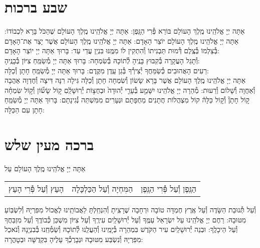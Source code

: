 \documentclass[twoside, openany, parskip=half, 11pt]{book}
\begin{document}
\section[שבע ברכות]{ שבע ברכות }

אַתָּה יְיָ אֱלֹהֵֽינוּ מֶֽלֶךְ הָעוֹלָם בּוֹרֵא פְּ֯רִי הַגָּֽפֶן:\hfill \break
{}
אַתָּה יְיָ אֱלֹהֵֽינוּ מֶֽלֶךְ הָעוֹלָם שֶׁהַכֹּל בָּרָא לִכְבוֹדוֹ:\hfill \break
{}
אַתָּה יְיָ אֱלֹהֵֽינוּ מֶֽלֶךְ הָעוֹלָם יוֹצֵר הָאָדָם:\hfill \break
{}
אַתָּה יְיָ אֱלֹהֵֽינוּ מֶֽלֶךְ הָעוֹלָם אֲשֶׁר יָצַר אֶת־הָאָדָם בְּ֯צַלְמוֹ
בְּ֯צֶֽלֶם דְּ֯מוּת תַּבְנִיתוֹ וְ֯הִתְקִין לוֹ מִמֶּֽנּוּ בִּנְיַן עֲדֵי עַד: בָּרוּךְ אַתָּה יְיָ יוֹצֵר הָאָדָם:\\
וְ֯תָגֵל הָעֲקָרָה בְּ֯קִבּוּץ בָּנֶֽיהָ לְ֯תוֹכָהּ בְּ֯שִׂמְחָה:
בָּרוּךְ אַתָּה יְיָ מְ֯שַׂמֵּֽחַ צִיּוֹן בְּ֯בָנֶֽיהָ:\\
רֵעִים הָאֲהוּבִים כְּ֯שַׂמֵּחֲךָ יְ֯צִירְ֯ךָ בְּ֯גַן עֵֽדֶן מִקֶּֽדֶם:
בָּרוּךְ אַתָּה יְיָ מְ֯שַׂמֵּֽחַ חָתָן וְ֯כַלָּה:\\
אַתָּה יְיָ אֱלֹהֵֽינוּ מֶֽלֶךְ הָעוֹלָם
אֲשֶׁר בָּרָא שָׂשׂוֹן וְ֯שִׂמְחָה חָתָן וְ֯כַלָּה גִּילָה רִנָּה דִּיצָה וְ֯חֶדְוָה
אַהֲבָה וְ֯אַחֲוָה וְ֯שָׁלוֹם וְ֯רֵעוּת:
מְ֯הֵרָה יְיָ אֱלֹהֵֽינוּ יִשָּׁמַ֣ע
בְּ֯עָרֵ֤י יְ֯הוּדָה֙ וּבְחֻצ֣וֹת יְ֯רֽוּשָׁלַֽ֔םִ
ק֣וֹל שָׂשׂ֞וֹן וְ֯ק֣וֹל שִׂמְחָ֗ה ק֣וֹל חָתָן֘ וְ֯ק֣וֹל כַּלָּה֒
קוֹל מִצְהֲלוֹת חֲתָנִים מֵחֻפָּתָם וּנְעָרִים מִמִּשְׁתֵּה נְ֯גִינָתָם:
בָּרוּךְ אַתָּה יְיָ מְ֯שַׂמֵּֽחַ חָתָן עִם הַכַּלָּה:


\nextpage

\section[ברכה מעין שלש]{ ברכה מעין שלש }


אַתָּה יְיָ אֱלֹהֵֽינוּ מֶֽלֶךְ הָעוֹלָם עַל

\begin{tabular}{>{\centering\arraybackslash}m{} | >{\centering\arraybackslash}m{} | >{\centering\arraybackslash}m{}}

הָעֵץ וְ֯עַל פְּ֯רִי הָעֵץ
&
הַמִּחְיָה וְ֯עַל הַכַּלְכָּלָה
&
הַגֶּֽפֶן וְ֯עַל פְּ֯רִי הַגֶּֽפֶן \\

\end{tabular}

וְ֯עַל תְּ֯נוּבַת הַשָּׂדֶה וְ֯עַל אֶֽרֶץ חֶמְדָּה טוֹבָה וּרְחָבָה
שֶׁרָצִֽיתָ וְ֯הִנְחַֽלְתָּ לַאֲבוֹתֵֽינוּ לֶאֱכוֹל מִפִּרְיָהּ וְ֯לִשְׂבּֽוֹעַ מִטּוּבָהּ:
רַחֶם יְיָ אֱלֹהֵֽינוּ עַל יִשְׂרָאֵל עַמֶּֽךָ וְ֯עַל יְ֯רוּשָׁלַֽיִם עִירֶֽךָ וְ֯עַל צִיּוֹן מִשְׁכַּן כְּ֯בוֹדֶֽךָ וְ֯עַל מִזְבַּחֲךָ וְ֯עַל הֵיכָלֶֽךָ: וּבְנֵה יְ֯רוּשָׁלַֽיִם עִיר הַקֹּדֶשׁ בִּמְהֵרָה בְּ֯יָמֵֽינוּ וְ֯הַעֲלֵֽנוּ לְ֯תוֹכָהּ וְ֯שַׂמְּ֯חֵֽנוּ בְּ֯בִנְיָנָהּ וְ֯נֹאכַל מִפִּרְיָהּ וְ֯נִשְׂבַּע מִטּוּבָהּ וּנְבָרֶכְ֯ךָ עָלֶיהָ בִּקְדֻשָּׁה וּבְטׇהֳרָה:
\end{document}
